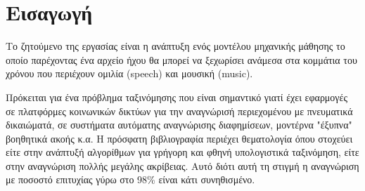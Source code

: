 \section{Εισαγωγή}

Το ζητούμενο της εργασίας είναι η ανάπτυξη ενός μοντέλου μηχανικής
μάθησης το οποίο παρέχοντας ένα αρχείο ήχου θα μπορεί να ξεχωρίσει
ανάμεσα στα κομμάτια του χρόνου που περιέχουν ομιλία (speech) και
μουσική (music).

Πρόκειται για ένα πρόβλημα ταξινόμησης που είναι σημαντικό γιατί έχει
εφαρμογές σε πλατφόρμες κοινωνικών δικτύων για την αναγνώρισή
περιεχομένου με πνευματικά δικαιώματά, σε συστήματα αυτόματης
αναγνώρισης διαφημίσεων, μοντέρνα "έξυπνα" βοηθητικά ακοής κ.α. Η
πρόσφατη βιβλιογραφία περιέχει θεματολογία όπου στοχεύει είτε στην
ανάπτυξή αλγορίθμων για γρήγορη και φθηνή υπολογιστικά ταξινόμηση,
είτε στην αναγνώριση πολλής μεγάλης ακρίβειας. Αυτό διότι αυτή τη
στιγμή η αναγνώριση με ποσοστό επιτυχίας γύρω στο 98\% είναι κάτι
συνηθισμένο.


